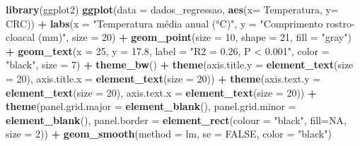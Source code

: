 \documentclass[
]{book}
\newenvironment{Shaded}{\begin{snugshade}}{\end{snugshade}}
\newcommand{\DataTypeTok}[1]{\textcolor[rgb]{0.13,0.29,0.53}{#1}}
\newcommand{\DecValTok}[1]{\textcolor[rgb]{0.00,0.00,0.81}{#1}}
\newcommand{\FloatTok}[1]{\textcolor[rgb]{0.00,0.00,0.81}{#1}}
\newcommand{\KeywordTok}[1]{\textcolor[rgb]{0.13,0.29,0.53}{\textbf{#1}}}
\newcommand{\NormalTok}[1]{#1}
\newcommand{\OperatorTok}[1]{\textcolor[rgb]{0.81,0.36,0.00}{\textbf{#1}}}
\newcommand{\OtherTok}[1]{\textcolor[rgb]{0.56,0.35,0.01}{#1}}
\newcommand{\StringTok}[1]{\textcolor[rgb]{0.31,0.60,0.02}{#1}}
\begin{document}
\begin{Shaded}
\begin{Highlighting}[]
\KeywordTok{library}\NormalTok{(ggplot2)}
\KeywordTok{ggplot}\NormalTok{(}\DataTypeTok{data =}\NormalTok{ dados_regressao, }\KeywordTok{aes}\NormalTok{(}\DataTypeTok{x=}\NormalTok{ Temperatura, }\DataTypeTok{y=}\NormalTok{ CRC)) }\OperatorTok{+}\StringTok{ }
\StringTok{  }\KeywordTok{labs}\NormalTok{(}\DataTypeTok{x =} \StringTok{"Temperatura média anual (°C)"}\NormalTok{, }\DataTypeTok{y =} \StringTok{"Comprimento rostro-cloacal (mm)"}\NormalTok{, }\DataTypeTok{size =} \DecValTok{20}\NormalTok{) }\OperatorTok{+}
\StringTok{  }\KeywordTok{geom_point}\NormalTok{(}\DataTypeTok{size =} \DecValTok{10}\NormalTok{, }\DataTypeTok{shape =} \DecValTok{21}\NormalTok{, }\DataTypeTok{fill =} \StringTok{"gray"}\NormalTok{) }\OperatorTok{+}
\StringTok{  }\KeywordTok{geom_text}\NormalTok{(}\DataTypeTok{x =} \DecValTok{25}\NormalTok{, }\DataTypeTok{y =} \FloatTok{17.8}\NormalTok{, }\DataTypeTok{label =} \StringTok{"R2 = 0.26, P < 0.001"}\NormalTok{, }\DataTypeTok{color =} \StringTok{"black"}\NormalTok{, }\DataTypeTok{size =} \DecValTok{7}\NormalTok{) }\OperatorTok{+}
\StringTok{  }\KeywordTok{theme_bw}\NormalTok{() }\OperatorTok{+}
\StringTok{  }\KeywordTok{theme}\NormalTok{(}\DataTypeTok{axis.title.y =} \KeywordTok{element_text}\NormalTok{(}\DataTypeTok{size =} \DecValTok{20}\NormalTok{), }\DataTypeTok{axis.title.x =} \KeywordTok{element_text}\NormalTok{(}\DataTypeTok{size =} \DecValTok{20}\NormalTok{)) }\OperatorTok{+}
\StringTok{  }\KeywordTok{theme}\NormalTok{(}\DataTypeTok{axis.text.y =} \KeywordTok{element_text}\NormalTok{(}\DataTypeTok{size =} \DecValTok{20}\NormalTok{), }\DataTypeTok{axis.text.x =} \KeywordTok{element_text}\NormalTok{(}\DataTypeTok{size =} \DecValTok{20}\NormalTok{)) }\OperatorTok{+}
\StringTok{  }\KeywordTok{theme}\NormalTok{(}\DataTypeTok{panel.grid.major =} \KeywordTok{element_blank}\NormalTok{(), }\DataTypeTok{panel.grid.minor =} \KeywordTok{element_blank}\NormalTok{(), }
        \DataTypeTok{panel.border =} \KeywordTok{element_rect}\NormalTok{(}\DataTypeTok{colour =} \StringTok{"black"}\NormalTok{, }\DataTypeTok{fill=}\OtherTok{NA}\NormalTok{, }\DataTypeTok{size =} \DecValTok{2}\NormalTok{)) }\OperatorTok{+}
\StringTok{  }\KeywordTok{geom_smooth}\NormalTok{(}\DataTypeTok{method =}\NormalTok{ lm, }\DataTypeTok{se =} \OtherTok{FALSE}\NormalTok{, }\DataTypeTok{color =} \StringTok{"black"}\NormalTok{) }
\end{Highlighting}
\end{Shaded}
\end{document}
